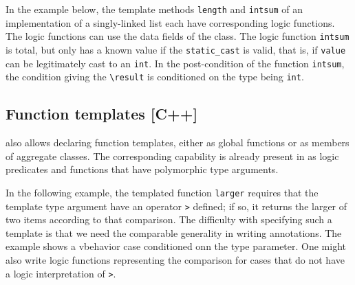 In the example below, the template methods \lstinline|length| and \lstinline|intsum| of an implementation of a singly-linked list each have corresponding logic functions. The logic functions can use the data fields of the class. The logic function \lstinline|intsum| is total, but only has a known value if the \lstinline|static_cast| is valid, that is, if \lstinline|value| can be legitimately cast to an \lstinline|int|. In the post-condition of the \lang function \lstinline|intsum|, the condition giving the \lstinline|\result| is conditioned on the type being \lstinline|int|.
\begin{example}



\end{example}

\subsection{Function templates [C++]}

\lang also allows declaring function templates, either as global functions or as members of aggregate classes. The corresponding capability is already present in \NAME as logic predicates and functions that have polymorphic type arguments.

In the following example, the templated function \lstinline|larger| requires that the template type argument have an operator \lstinline|>| defined; if so, it returns the larger of two items according to that comparison. The difficulty with specifying such a template is that we need the comparable generality in writing \NAME annotations. The example shows a vbehavior case conditioned onn the type parameter. One might also write logic functions representing the comparison for cases that do not have a logic interpretation of \lstinline|>|.

\begin{example}



\end{example}


